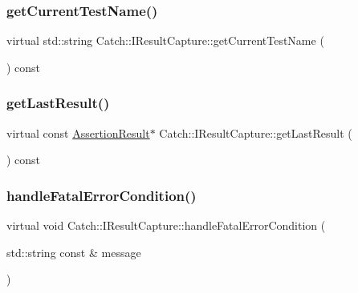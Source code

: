 \subsubsection{\texorpdfstring{get\+Current\+Test\+Name()}{getCurrentTestName()}}
{\footnotesize\ttfamily virtual std\+::string Catch\+::\+I\+Result\+Capture\+::get\+Current\+Test\+Name (\begin{DoxyParamCaption}{ }\end{DoxyParamCaption}) const\hspace{0.3cm}{\ttfamily [pure virtual]}}

\hypertarget{struct_catch_1_1_i_result_capture_ab18872c89fab97405a56e9c6a4919736}{}\label{struct_catch_1_1_i_result_capture_ab18872c89fab97405a56e9c6a4919736} 
\subsubsection{\texorpdfstring{get\+Last\+Result()}{getLastResult()}}
{\footnotesize\ttfamily virtual const \hyperlink{class_catch_1_1_assertion_result}{Assertion\+Result}$\ast$ Catch\+::\+I\+Result\+Capture\+::get\+Last\+Result (\begin{DoxyParamCaption}{ }\end{DoxyParamCaption}) const\hspace{0.3cm}{\ttfamily [pure virtual]}}

\hypertarget{struct_catch_1_1_i_result_capture_a7d995222301e6605f26549726b30c3ee}{}\label{struct_catch_1_1_i_result_capture_a7d995222301e6605f26549726b30c3ee} 
\subsubsection{\texorpdfstring{handle\+Fatal\+Error\+Condition()}{handleFatalErrorCondition()}}
{\footnotesize\ttfamily virtual void Catch\+::\+I\+Result\+Capture\+::handle\+Fatal\+Error\+Condition (\begin{DoxyParamCaption}\item[{std\+::string const \&}]{message }\end{DoxyParamCaption})\hspace{0.3cm}{\ttfamily [pure virtual]}}

